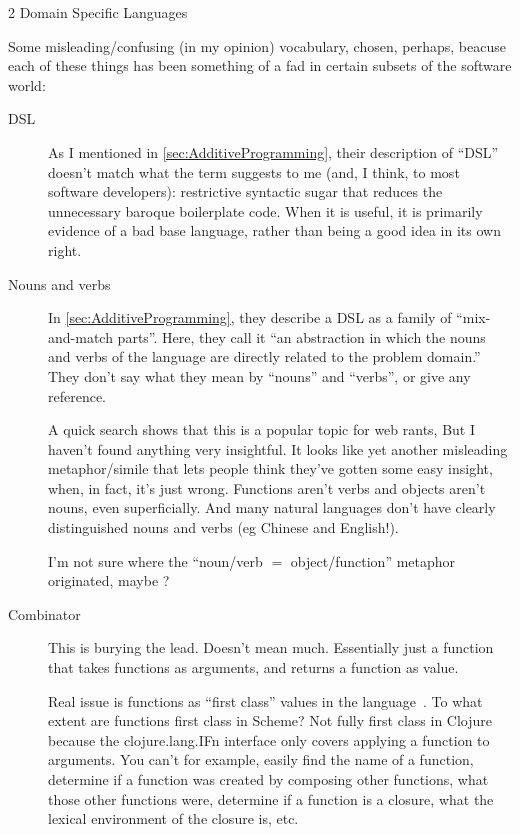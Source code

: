 \documentclass[12pt]{PalisadesLakesBook}
\begin{document}
\begin{plSection}{2 Domain Specific Languages}

Some misleading/confusing  (in my opinion)
vocabulary, chosen, perhaps, beacuse 
each of these things has been something of a fad
in certain subsets of the software world:
\begin{description}
\item[DSL]
As I mentioned in \cref{sec:AdditiveProgramming},
their description of ``DSL'' doesn't match 
what the term suggests to me
(and, I think, to most software developers):
restrictive syntactic sugar that reduces 
the unnecessary baroque boilerplate code. 
When it is useful, it is primarily evidence 
of a bad base language,
rather than being a good idea in its own right.

\item[Nouns and verbs]
In \cref{sec:AdditiveProgramming},
they describe a DSL as a family
of ``mix-and-match parts''.
Here, they call it  
``an abstraction in which the nouns and verbs of the language
are directly related to the problem domain.''
They don't say what they mean by ``nouns'' and ``verbs'',
or give any reference.

A quick search shows that this is a popular topic for web rants,
But I haven't found anything very insightful.
It looks like yet another misleading metaphor/simile
that lets people think they've gotten some easy insight,
when, in fact, it's just wrong.
Functions aren't verbs and objects aren't nouns,
even superficially.
And many natural languages don't  have clearly distinguished 
nouns and verbs (eg Chinese and English!).

I'm not sure where the ``noun/verb $=$ object/function'' 
metaphor originated,
maybe ?

\item[Combinator]
This is burying the lead. 
Doesn't mean much.
Essentially just a function that takes functions as arguments,
and returns a function as value.

Real issue is functions as ``first class'' values in the 
language~\cite{wiki:FirstClassValue}.
To what extent are functions first class in Scheme?
Not fully first class in Clojure because the 
{\clojureFont clojure.lang.IFn} interface only covers applying 
a function to arguments.
You can't for example, easily find the name of a function,
determine if a function was created 
by composing other functions,
what those other functions were,
determine if a function is a closure,
what the lexical environment of the closure is,
etc.


\end{description}
\end{plSection}
\end{document}
